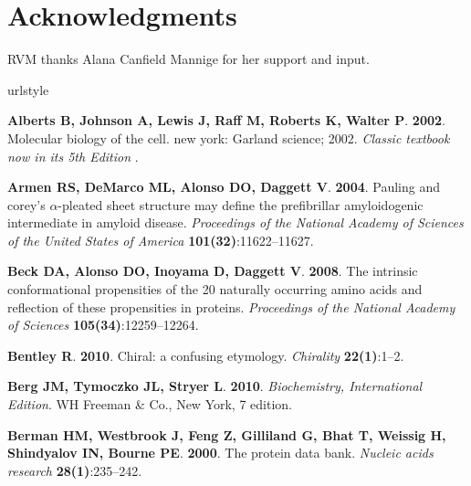 \documentclass[fleqn,10pt,lineno]{wlpeerj} %
\begin{document}
\section*{Acknowledgments}

RVM thanks Alana Canfield Mannige for her support and input. 

%
\begin{thebibliography}{58}
\providecommand{\natexlab}[1]{#1}
\expandafter\ifx\csname urlstyle\endcsname\relax
  \providecommand{\doi}[1]{doi:\discretionary{}{}{}#1}\else
  \providecommand{\doi}{doi:\discretionary{}{}{}\begingroup
  \urlstyle{rm}\Url}\fi

\textbf{Alberts B, Johnson A, Lewis J, Raff M, Roberts K, Walter P}.
  \textbf{2002}.
\newblock Molecular biology of the cell. new york: Garland science; 2002.
\newblock \emph{Classic textbook now in its 5th Edition} .

\textbf{Armen RS, DeMarco ML, Alonso DO, Daggett V}. \textbf{2004}.
\newblock Pauling and corey's $\alpha$-pleated sheet structure may define the
  prefibrillar amyloidogenic intermediate in amyloid disease.
\newblock \emph{Proceedings of the National Academy of Sciences of the United
  States of America} \textbf{101(32)}:11622--11627.

\textbf{Beck DA, Alonso DO, Inoyama D, Daggett V}. \textbf{2008}.
\newblock The intrinsic conformational propensities of the 20 naturally
  occurring amino acids and reflection of these propensities in proteins.
\newblock \emph{Proceedings of the National Academy of Sciences}
  \textbf{105(34)}:12259--12264.

\textbf{Bentley R}. \textbf{2010}.
\newblock Chiral: a confusing etymology.
\newblock \emph{Chirality} \textbf{22(1)}:1--2.

\textbf{Berg JM, Tymoczko JL, Stryer L}. \textbf{2010}.
\newblock \emph{Biochemistry, International Edition}.
\newblock WH Freeman \& Co., New York, 7 edition.

\textbf{Berman HM, Westbrook J, Feng Z, Gilliland G, Bhat T, Weissig H,
  Shindyalov IN, Bourne PE}. \textbf{2000}.
\newblock The protein data bank.
\newblock \emph{Nucleic acids research} \textbf{28(1)}:235--242.


\end{thebibliography}
\end{document}
